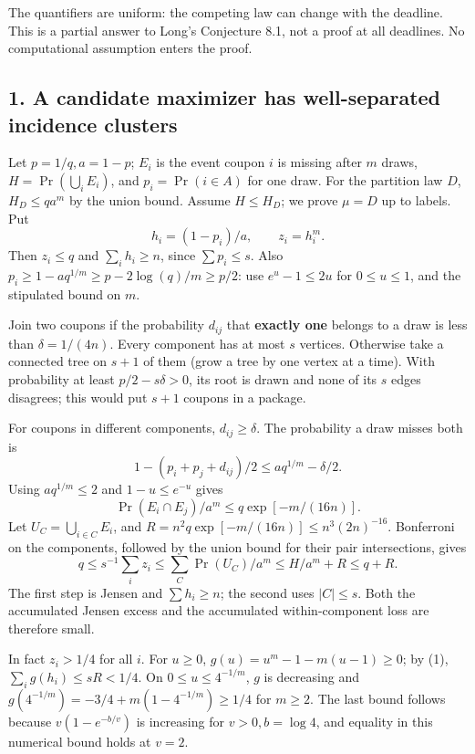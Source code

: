\documentclass[10pt]{article}
\begin{document}
The quantifiers are uniform: the competing law can change with the
deadline. This is a partial answer to Long's Conjecture 8.1, not a proof
at all deadlines. No computational assumption enters the proof.

\subsection*{1. A candidate maximizer has well-separated incidence
clusters}\label{a-candidate-maximizer-has-well-separated-incidence-clusters}

Let \(p=1/q, a=1-p\); \(E_i\) is the event coupon \(i\) is missing after
\(m\) draws, \(H=\Pr(\bigcup_i E_i)\), and \(p_i=\Pr(i\in A)\) for one
draw. For the partition law \(D\), \(H_D\le qa^m\) by the union bound.
Assume \(H\le H_D\); we prove \(\mu=D\) up to labels. Put \[
h_i=(1-p_i)/a,\qquad z_i=h_i^m.
\] Then \(z_i\le q\) and \(\sum_i h_i\ge n\), since \(\sum p_i\le s\).
Also \(p_i\ge1-aq^{1/m}\ge p-2\log(q)/m\ge p/2\): use \(e^u-1\le2u\) for
\(0\le u\le1\), and the stipulated bound on \(m\).

Join two coupons if the probability \(d_{ij}\) that \textbf{exactly one}
belongs to a draw is less than \(\delta=1/(4n)\). Every component has at
most \(s\) vertices. Otherwise take a connected tree on \(s+1\) of them
(grow a tree by one vertex at a time). With probability at least
\(p/2-s\delta>0\), its root is drawn and none of its \(s\) edges
disagrees; this would put \(s+1\) coupons in a package.

For coupons in different components, \(d_{ij}\ge\delta\). The
probability a draw misses both is \[
1-(p_i+p_j+d_{ij})/2\le a q^{1/m}-\delta/2.
\] Using \(a q^{1/m}\le2\) and \(1-u\le e^{-u}\) gives \[
\Pr(E_i\cap E_j)/a^m\le q\exp[-m/(16n)].
\] Let \(U_C=\bigcup_{i\in C}E_i\), and
\(R=n^2q\exp[-m/(16n)]\le n^3(2n)^{-16}\). Bonferroni on the components,
followed by the union bound for their pair intersections, gives \[
q\le s^{-1}\sum_i z_i\le\sum_C\Pr(U_C)/a^m\le H/a^m+R\le q+R. \tag{1}
\] The first step is Jensen and \(\sum h_i\ge n\); the second uses
\(|C|\le s\). Both the accumulated Jensen excess and the accumulated
within-component loss are therefore small.

In fact \(z_i>1/4\) for all \(i\). For \(u\ge0\),
\(g(u)=u^m-1-m(u-1)\ge0\); by (1), \(\sum_i g(h_i)\le sR<1/4\). On
\(0\le u\le4^{-1/m}\), \(g\) is decreasing and
\(g(4^{-1/m})=-3/4+m(1-4^{-1/m})\ge1/4\) for \(m\ge2\). The last bound
follows because \(v(1-e^{-b/v})\) is increasing for \(v>0, b=\log 4\),
and equality in this numerical bound holds at \(v=2\).
\end{document}
